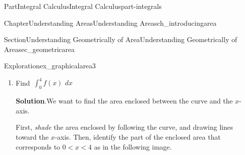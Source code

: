 \documentclass{tufte-book}
\newcommand{\blocktitlefont}{\relax}
\numberwithin{equation}{chapter}
\newcommand{\intdx}[1]{{\,\int#1\,\,dx}}
\newcommand{\lt}{<}
\begin{document}
\begin{partptx}{Part}{Integral Calculus}{}{Integral Calculus}{}{}{part-integrals}
\begin{chapterptx}{Chapter}{Understanding Areas}{}{Understanding Areas}{}{}{ch_introducingarea}
\begin{sectionptx}{Section}{Understanding Geometrically of Area}{}{Understanding Geometrically of Area}{}{}{sec_geometricarea}
\begin{exploration}{Exploration}{}{ex_graphicalarea3}
\begin{enumerate}[font=\bfseries,label=(\alph*),ref=\alph*]
\begin{image}{0.25}{0.5}{0.25}{}
{
}%
\end{image}%
The shaded area is triangle with base \(b=2\) and height \(h=1\). The region enclosed is \emph{above} the \(x\)-axis so it has \emph{positive} net area. Putting this together,%
\begin{equation*}
\intdx{_0^2 f(x) } = (+) \frac{1}{2}\cdot 2 \cdot 1 = 0.5
\end{equation*}
%
\item{}Find \(\intdx{_0^4 f(x) }\)%
\par\smallskip%
\noindent\textbf{\blocktitlefont Solution}.\hypertarget{ex_graphicalarea3-4-2}{}\quad{}We want to find the area enclosed between the curve and the \(x\)-axis.%
\par
First, \emph{shade} the area enclosed by following the curve, and drawing lines toward the \(x\)-axis. Then, identify the part of the enclosed area that corresponds to \(0\lt x \lt 4\) as in the following image.%
\begin{image}{0.25}{0.5}{0.25}{}%
\end{image}
\end{enumerate}
\end{exploration}
\end{sectionptx}
\end{chapterptx}
\end{partptx}
\end{document}
